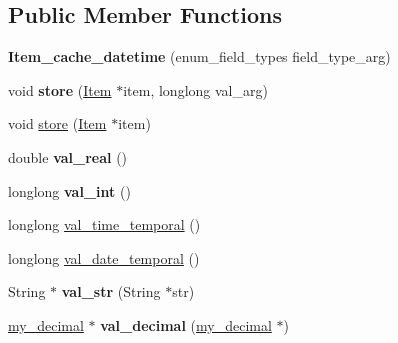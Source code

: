 \subsection*{Public Member Functions}
\begin{DoxyCompactItemize}
\item 
\mbox{\label{classItem__cache__datetime_afac03b40359576a1fd96384331a7d904}} 
{\bfseries Item\+\_\+cache\+\_\+datetime} (enum\+\_\+field\+\_\+types field\+\_\+type\+\_\+arg)
\item 
\mbox{\label{classItem__cache__datetime_a45aa6b583ce9b14cfa62dbb4cdc5d02a}} 
void {\bfseries store} (\mbox{\hyperlink{classItem}{Item}} $\ast$item, longlong val\+\_\+arg)
\item 
void \mbox{\hyperlink{classItem__cache__datetime_a75bbda93393db797f710521aabd9200c}{store}} (\mbox{\hyperlink{classItem}{Item}} $\ast$item)
\item 
\mbox{\label{classItem__cache__datetime_a6e14b97d53c47c101f50c9ab12a5546b}} 
double {\bfseries val\+\_\+real} ()
\item 
\mbox{\label{classItem__cache__datetime_acfc4f252beeeeb9094ebad3869b441c0}} 
longlong {\bfseries val\+\_\+int} ()
\item 
longlong \mbox{\hyperlink{classItem__cache__datetime_a3a3dc978f89d305b26a866eebf2705a6}{val\+\_\+time\+\_\+temporal}} ()
\item 
longlong \mbox{\hyperlink{classItem__cache__datetime_ab2431102a1d70199b6d9438c12ac3b24}{val\+\_\+date\+\_\+temporal}} ()
\item 
\mbox{\label{classItem__cache__datetime_ad9515ee6cb00562e74d0717260b12114}} 
String $\ast$ {\bfseries val\+\_\+str} (String $\ast$str)
\item 
\mbox{\label{classItem__cache__datetime_ae2e388ad754de579fa2ba795a1426331}} 
\mbox{\hyperlink{classmy__decimal}{my\+\_\+decimal}} $\ast$ {\bfseries val\+\_\+decimal} (\mbox{\hyperlink{classmy__decimal}{my\+\_\+decimal}} $\ast$)
\item 
\mbox{\label{classItem__cache__datetime_a6fa6d484b88d4c8c21e722d57a7487ea}} 

\end{DoxyCompactItemize}
